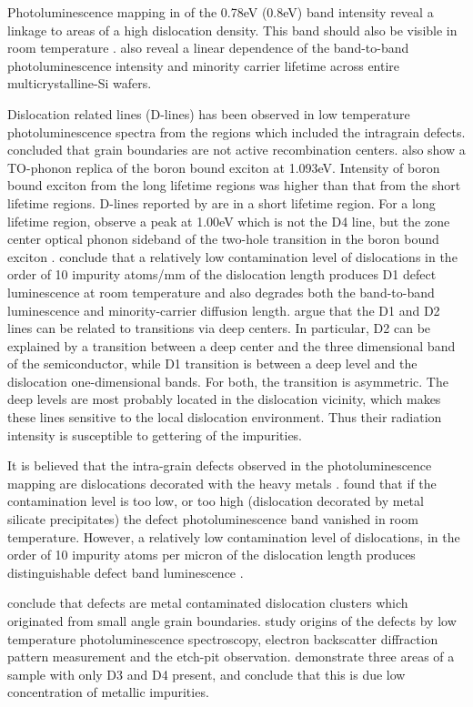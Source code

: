 Photoluminescence mapping in \cite{tarasov00} of the 0.78eV (0.8eV) band intensity reveal a linkage to areas of a high dislocation density. This band should also be visible in room temperature \cite{tarasov00}. \cite{tarasov00} also reveal a linear dependence of the band-to-band photoluminescence intensity and minority carrier lifetime across entire multicrystalline-Si wafers.

Dislocation related lines (D-lines) has been observed in low temperature photoluminescence spectra from the regions which included the intragrain defects. \cite{sugimoto06} concluded that grain boundaries are not active recombination centers. \cite{sugimoto06} also show a TO-phonon replica of the boron bound exciton at 1.093eV. Intensity of boron bound exciton from the long lifetime regions was higher than that from the short lifetime regions. D-lines reported by \cite{sauer85} are in a short lifetime region. For a long lifetime region, \cite{sugimoto06} observe a peak at 1.00eV which is not the D4 line, but the zone center optical phonon sideband of the two-hole transition in the boron bound exciton \cite{dean67}. \cite{kitler02} conclude that a relatively low contamination level of dislocations in the order of 10 impurity atoms/mm of the dislocation length produces D1 defect luminescence at room temperature and also degrades both the band-to-band luminescence and minority-carrier diffusion length. \cite{arguirov07} argue that the D1 and D2 lines can be related to transitions via deep centers. In particular, D2 can be explained by a transition between a deep center and the three dimensional band of the semiconductor, while D1 transition is between a deep level and the dislocation one-dimensional bands. For both, the transition is asymmetric. The deep levels are most probably located in the dislocation vicinity, which makes these lines sensitive to the local dislocation environment. Thus their radiation intensity is susceptible to gettering of the impurities.

It is believed that the intra-grain defects observed in the photoluminescence mapping are dislocations decorated with the heavy metals \cite{sugimoto06}. \cite{tarasov01} found that if the contamination level is too low, or too high (dislocation decorated by metal silicate precipitates) the defect photoluminescence band vanished in room temperature. However, a relatively low contamination level of dislocations, in the order of 10 impurity atoms per micron of the dislocation length produces distinguishable defect band luminescence \cite{tarasov01,kitler02}. 

\cite{sugimoto07} conclude that defects are metal contaminated dislocation clusters which originated from small angle grain boundaries. \cite{sugimoto07} study origins of the defects by low temperature photoluminescence spectroscopy, electron backscatter diffraction pattern measurement and the etch-pit observation. \cite{arguirov07} demonstrate three areas of a sample with only D3 and D4 present, and conclude that this is due low concentration of metallic impurities.
